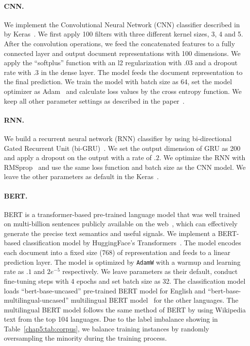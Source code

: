 \paragraph{CNN.} 
We implement the Convolutional Neural Network (CNN) classifier described in~\cite{kim2014convolutional, zimmerman2018improving} by Keras~\cite{chollet2015keras}.
We first apply 100 filters with three different kernel sizes, 3, 4 and 5.
After the convolution operations, we feed the concatenated features to a fully connected layer and output document representations with 100 dimensions.
We apply the ``softplus'' function with an l2 regularization with $.03$ and a dropout rate with $.3$ in the dense layer.
The model feeds the document representation to the final prediction.
We train the model with batch size as 64, set the model optimizer as Adam~\cite{kingma2014adam} and calculate loss values by the cross entropy function.
We keep all other parameter settings as described in the paper~\cite{kim2014convolutional}.


\paragraph{RNN.}
We build a recurrent neural network (RNN) classifier by using bi-directional Gated Recurrent Unit (bi-GRU)~\cite{chung2014empirical, park2018reducing}.
We set the output dimension of GRU as 200 and apply a dropout on the output with a rate of $.2$.
We optimize the RNN with RMSprop~\cite{tieleman2012lecture} and use the same loss function and batch size as the CNN model.
We leave the other parameters as default in the Keras~\cite{chollet2015keras}.


\paragraph{BERT.}
BERT is a transformer-based pre-trained language model that was well trained on multi-billion sentences publicly available on the web~\cite{devlin2019bert}, which can effectively generate the precise text semantics and useful signals.
We implement a BERT-based classification model by HuggingFace's Transformers~\cite{Wolf2019HuggingFacesTS}.
The model encodes each document into a fixed size (768) of representation and feeds to a linear prediction layer.
The model is optimized by \texttt{AdamW} with a warmup and learning rate as $.1$ and $2e^{-5}$ respectively.
We leave parameters as their default, conduct fine-tuning steps with 4 epochs and set batch size as 32.
The classification model loads ``bert-base-uncased'' pre-trained BERT model for English and ``bert-base-multilingual-uncased'' multilingual BERT model~\cite{gertner2019mitre} for the other languages.
The multilingual BERT model follows the same method of BERT by using Wikipedia text from the top 104 languages.
Due to the label imbalance showing in Table~\ref{chap5:tab:corpus}, we balance training instances by randomly oversampling the minority during the training process.


